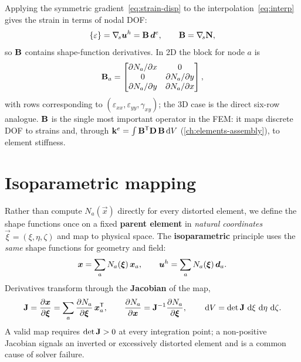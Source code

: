 Applying the symmetric gradient~\eqref{eq:strain-disp} to the
interpolation~\eqref{eq:interp} gives the strain in terms of nodal DOF:
\begin{equation}
  \{\varepsilon\} = \nabla_{\!s}\bm{u}^h = \mathbf{B}\,\bm{d}^{e}, \qquad \mathbf{B}=\nabla_{\!s}\mathbf{N},
  \label{eq:Bdef}
\end{equation}
so $\mathbf{B}$ contains shape-function derivatives. In 2D the block for node
$a$ is
\begin{equation}
  \mathbf{B}_a =
  \begin{bmatrix}
    \partial N_a/\partial x & 0 \\
    0 & \partial N_a/\partial y \\
    \partial N_a/\partial y & \partial N_a/\partial x
  \end{bmatrix},
\end{equation}
with rows corresponding to $(\varepsilon_{xx},\varepsilon_{yy},\gamma_{xy})$;
the 3D case is the direct six-row analogue. $\mathbf{B}$ is the single most
important operator in the FEM: it maps discrete DOF to strains and,
through $\mathbf{k}^{e}=\int\mathbf{B}^{\mathsf{T}}\mathbf{D}\,\mathbf{B}\,\mathrm{d} V$
(\cref{ch:elements-assembly}), to element stiffness.

\section{Isoparametric mapping}

Rather than compute $N_a(\vec x)$ directly for every distorted element,
we define the shape functions once on a fixed \textbf{parent element} in
\emph{natural coordinates} $\vec\xi=(\xi,\eta,\zeta)$ and map to physical
space. The \textbf{isoparametric} principle uses the \emph{same} shape
functions for geometry and field:
\begin{equation}
  \bm{x} = \sum_a N_a(\bm{\xi})\,\bm{x}_a, \qquad
  \bm{u}^h = \sum_a N_a(\bm{\xi})\,\bm{d}_a .
  \label{eq:isoparam}
\end{equation}
Derivatives transform through the \textbf{Jacobian} of the map,
\begin{equation}
  \mathbf{J} = \frac{\partial \bm{x}}{\partial \bm{\xi}} = \sum_a \frac{\partial N_a}{\partial \bm{\xi}}\,\bm{x}_a^{\mathsf{T}},
  \qquad
  \frac{\partial N_a}{\partial \bm{x}} = \mathbf{J}^{-1}\frac{\partial N_a}{\partial \bm{\xi}},
  \qquad
  \,\mathrm{d} V = \det\mathbf{J} \,\,\mathrm{d}\xi\,\,\mathrm{d}\eta\,\,\mathrm{d}\zeta .
  \label{eq:jacobian}
\end{equation}
A valid map requires $\det\mathbf{J}>0$ at every integration point; a
non-positive Jacobian signals an inverted or excessively distorted
element and is a common cause of solver failure.

